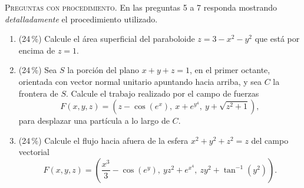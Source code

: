 \documentclass[11pt]{article}
\begin{document}
\vspace{4pt}
\noindent\textsc{Preguntas con procedimiento.} En las preguntas 5 a 7 responda mostrando \textit{detalladamente} el procedimiento utilizado.

\begin{enumerate}[start=5]
\item{} (24\,\%) Calcule el área superficial del paraboloide $z = 3 - x^2 - y^2$ que está por encima de $z = 1$.

\item{} (24\,\%) Sea $S$ la porción del plano $x + y + z = 1$, en el primer octante, orientada con vector normal unitario apuntando hacia arriba, y sea $C$ la frontera de $S$. Calcule el trabajo realizado por el campo de fuerzas
\[
F(x,y,z) = \left(z - \cos(e^x),\ x + e^{y^4},\ y + \sqrt{z^2+1}\right),
\]
para desplazar una partícula a lo largo de $C$.

\item{} (24\,\%) Calcule el flujo hacia afuera de la esfera $x^2 + y^2 + z^2 = z$ del campo vectorial
\[
F(x,y,z) = \left(\frac{x^3}{3} - \cos(e^y),\ yz^2 + e^{x^4},\ zy^2 + \tan^{-1}(y^2)\right).
\]
\end{enumerate}

\examfooter
\end{document}
